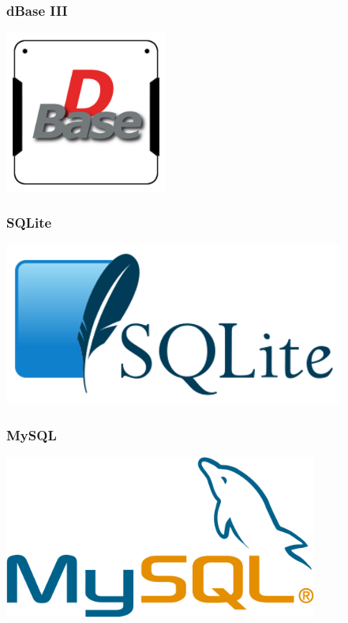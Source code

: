 \documentclass{beamer}
\begin{document}
\begin{frame}
  \frametitle{dBase III}


  \begin{center}
    \includegraphics[height=2.1in]{dBase.png}
  \end{center}
\end{frame}

\begin{frame}
  \frametitle{SQLite}


  \begin{center}
    \includegraphics[height=2.1in]{SQLite.png}
  \end{center}
\end{frame}

\begin{frame}
  \frametitle{MySQL}


  \begin{center}
    \includegraphics[height=2.1in]{mysql.png}
  \end{center}
\end{frame}
\end{document}
